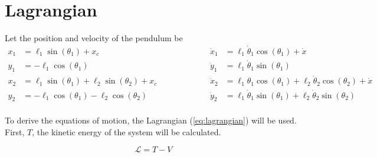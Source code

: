 \documentclass[10pt]{article}
\begin{document}
    \section{Lagrangian}
    Let the position and velocity of the pendulum be
    \begin{equation*}
    \begin{aligned}
        x_1 &= \ell_1 \sin(\theta_1) + x_c                                    & & \qquad \qquad & \dot x_1 &= \ell_1 \dot \theta_1 \cos(\theta_1) + \dot x \\
        y_1 &= -\ell_1 \cos(\theta_1)                                         & &  \quad \qquad & \dot y_1 &= \ell_1 \dot \theta_1 \sin(\theta_1)  \\
        x_2 &= \ell_1 \sin(\theta_1) + \ell_2 \sin(\theta_2) + x_c            & & \qquad \qquad & \dot x_2 &= \ell_1 \theta_1 \cos(\theta_1) + \ell_2 \dot \theta_2 \cos(\theta_2) + \dot x \\
        y_2 &= -\ell_1 \cos(\theta_1) - \ell_2 \cos(\theta_2)                 & &  \quad \qquad & \dot y_2 &= \ell_1 \dot \theta_1 \sin(\theta_1) + \ell_2 \dot \theta_2 \sin(\theta_2)  \\
    \end{aligned}
    \end{equation*}
    

    To derive the equations of motion, the Lagrangian (\ref{eq:lagrangian}) will be used.
    First, $T$, the kinetic energy of the system will be calculated.

    \begin{equation} \label{eq:lagrangian}
        \mathcal{L} = T - V
    \end{equation}
\end{document}
